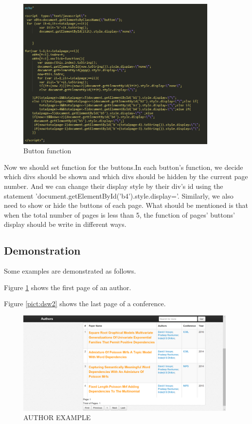 \documentclass{book}
\begin{document}
\begin{figure}[htbp]
\centering
\includegraphics[width=10.0cm]{img/dsw_fun.png}
\caption{Button function}
\end{figure}

Now we should set function for the buttons.In each button's function, we decide which divs should be shown and which divs should be hidden by the current page number. And we can change their display style by their div's id using the statement 'document.getElementById('b4').style.display='. Similarly, we also need to show or hide the buttons of each page. What should be mentioned is that when the total number of pages is less than 5, the function of pages' buttons' display should be write in different ways.





\subsection{Demonstration}
Some examples are demonstrated as follows.

Figure \ref{pict:dsw1} shows the first page of an author.

Figure \ref{pict:dsw2} shows the last page of a conference.

\begin{figure}[b]
\centering
\includegraphics[width=11.0cm]{img/dsw_author.png}
\caption{AUTHOR EXAMPLE}
\label{pict:dsw1}
\end{figure}
\end{document}

